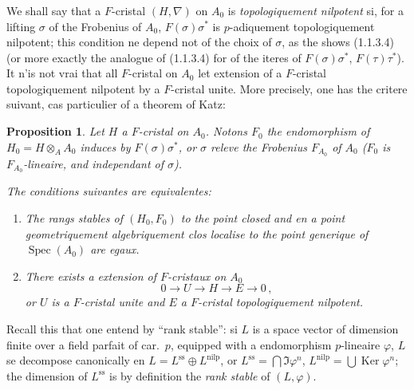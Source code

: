 \documentclass[12pt,a4paper]{article}
\theoremstyle{plain}
\newtheorem{proposition}[theorem]{Proposition}
\theoremstyle{definition}
\theoremstyle{remark}
\DeclareMathOperator{\Spec}{Spec}
\DeclareMathOperator{\Ker}{Ker}
\begin{document}
\subsubsection{}

We shall say that a $F$-cristal $(H,\nabla)$ on $A_0$ is \emph{topologiquement nilpotent} si, for a lifting $\sigma$ of the Frobenius of $A_0$, $F(\sigma)\sigma^*$ is $p$-adiquement topologiquement nilpotent; this condition ne depend not of the choix of $\sigma$, as the shows (1.1.3.4) (or more exactly the analogue of (1.1.3.4) for of the iteres of $F(\sigma)\sigma^*$, $F(\tau)\tau^*$). It n'is not vrai that all $F$-cristal on $A_0$ let extension of a $F$-cristal topologiquement nilpotent by a $F$-cristal unite. More precisely, one has the critere suivant, cas particulier of a theorem of Katz:

\begin{proposition}\label{prop:1.2.4}
Let $H$ a $F$-cristal on $A_0$. Notons $F_0$ the endomorphism of $H_0 = H \otimes_A A_0$ induces by $F(\sigma)\sigma^*$, or $\sigma$ releve the Frobenius $F_{A_0}$ of $A_0$ ($F_0$ is $F_{A_0}$-lineaire, and independant of $\sigma$).

The conditions suivantes are equivalentes:
\begin{enumerate}[label=(\roman*)]
\item The rangs stables of $(H_0, F_0)$ to the point closed and en a point geometriquement algebriquement clos localise to the point generique of $\Spec(A_0)$ are egaux.
\item There exists a extension of $F$-cristaux on $A_0$
\[
0 \longrightarrow U \longrightarrow H \longrightarrow E \longrightarrow 0\,,
\]
or $U$ is a $F$-cristal unite and $E$ a $F$-cristal topologiquement nilpotent.
\end{enumerate}
\end{proposition}

Recall this that one entend by ``rank stable'': si $L$ is a space vector of dimension finite over a field parfait of car.\ $p$, equipped with a endomorphism $p$-lineaire $\varphi$, $L$ se decompose canonically en $L = L^{\mathrm{ss}} \oplus L^{\mathrm{nilp}}$, or $L^{\mathrm{ss}} = \bigcap \Im \varphi^n$, $L^{\mathrm{nilp}} = \bigcup \Ker \varphi^n$; the dimension of $L^{\mathrm{ss}}$ is by definition the \emph{rank stable} of $(L,\varphi)$.
\end{document}
